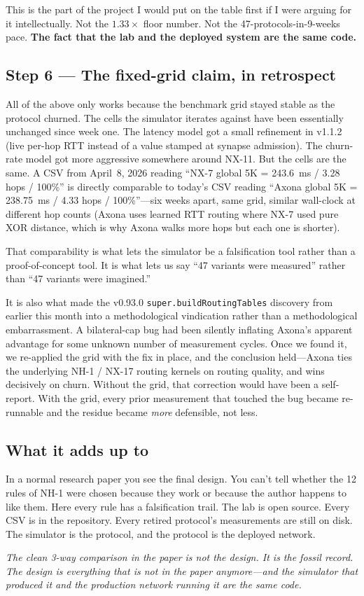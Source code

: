 \documentclass[nobib]{tufte-handout}
\begin{document}
This is the part of the project I would put on the table first if I were arguing for it intellectually. Not the $1.33\times$ floor number. Not the 47-protocols-in-9-weeks pace. \textbf{The fact that the lab and the deployed system are the same code.}

\subsection*{Step 6 --- The fixed-grid claim, in retrospect}

All of the above only works because the benchmark grid stayed stable as the protocol churned. The cells the simulator iterates against have been essentially unchanged since week one. The latency model got a small refinement in v1.1.2 (live per-hop RTT instead of a value stamped at synapse admission). The churn-rate model got more aggressive somewhere around NX-11. But the cells are the same. A CSV from April~8, 2026 reading ``NX-7 global 5K = 243.6~ms / 3.28 hops / 100\%'' is directly comparable to today's CSV reading ``Axona global 5K = 238.75~ms / 4.33 hops / 100\%''---six weeks apart, same grid, similar wall-clock at different hop counts (Axona uses learned RTT routing where NX-7 used pure XOR distance, which is why Axona walks more hops but each one is shorter).

That comparability is what lets the simulator be a falsification tool rather than a proof-of-concept tool. It is what lets us say ``47 variants were measured'' rather than ``47 variants were imagined.''

It is also what made the v0.93.0 \texttt{super.buildRoutingTables} discovery from earlier this month into a methodological vindication rather than a methodological embarrassment. A bilateral-cap bug had been silently inflating Axona's apparent advantage for some unknown number of measurement cycles. Once we found it, we re-applied the grid with the fix in place, and the conclusion held---Axona ties the underlying NH-1 / NX-17 routing kernels on routing quality, and wins decisively on churn. Without the grid, that correction would have been a self-report. With the grid, every prior measurement that touched the bug became re-runnable and the residue became \emph{more} defensible, not less.

\subsection*{What it adds up to}

In a normal research paper you see the final design. You can't tell whether the 12 rules of NH-1 were chosen because they work or because the author happens to like them. Here every rule has a falsification trail. The lab is open source. Every CSV is in the repository. Every retired protocol's measurements are still on disk. The simulator is the protocol, and the protocol is the deployed network.

\bigskip

\noindent\emph{The clean 3-way comparison in the paper is not the design. It is the fossil record. The design is everything that is not in the paper anymore---and the simulator that produced it and the production network running it are the same code.}
\end{document}

